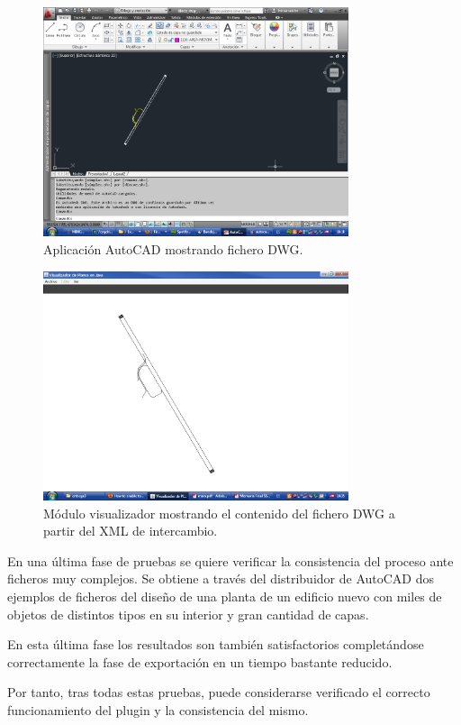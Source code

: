 \begin{figure}[H]
\begin{center}
\includegraphics[width=0.8\textwidth]{imgs/autocad2}
\caption{Aplicación AutoCAD mostrando fichero DWG.}
\end{center}
\end{figure}

\begin{figure}[H]
\begin{center}
\includegraphics[width=0.8\textwidth]{imgs/ejemplo_salida}
\caption{Módulo visualizador mostrando el contenido del fichero DWG a partir del XML de intercambio.}
\end{center}
\end{figure}

En una última fase de pruebas se quiere verificar la consistencia del proceso ante ficheros muy complejos. Se obtiene a través del distribuidor de AutoCAD dos ejemplos de ficheros del diseño de una planta de un edificio nuevo con miles de objetos de distintos tipos en su interior y gran cantidad de capas. 

En esta última fase los resultados son también satisfactorios completándose correctamente la fase de exportación en un tiempo bastante reducido.

Por tanto, tras todas estas pruebas, puede considerarse verificado el correcto funcionamiento del plugin y la consistencia del mismo.